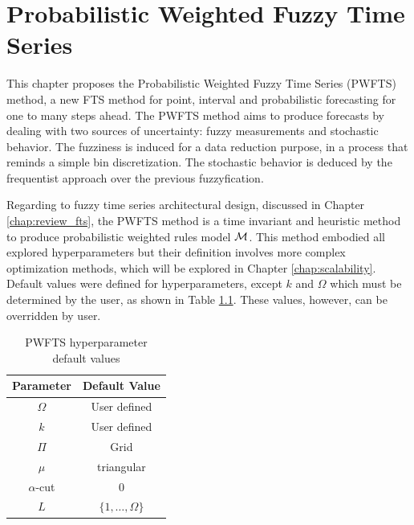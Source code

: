 \chapter[Probabilistic Weighted Fuzzy Time Series]{Probabilistic Weighted Fuzzy Time Series} 
\label{chap:pwfts}


This chapter proposes the Probabilistic Weighted Fuzzy Time Series (PWFTS) method, a new FTS method for point, interval and probabilistic forecasting for one to many steps ahead. The PWFTS method aims to produce forecasts by dealing with two sources of uncertainty: fuzzy measurements and stochastic behavior. The fuzziness is induced for a data reduction purpose, in a process that reminds a simple bin discretization. The stochastic behavior is deduced by the  frequentist approach over the previous fuzzyfication. 

Regarding to fuzzy time series architectural design, discussed in Chapter \ref{chap:review_fts}, the PWFTS method is a  time invariant and heuristic method to produce probabilistic weighted rules model $\mathcal{M}$. This method embodied all explored hyperparameters but their definition involves more complex optimization methods, which will be explored in Chapter \ref{chap:scalability}. Default values were defined for hyperparameters, except $k$ and $\Omega$ which must be determined by the user, as shown in Table \ref{tab:pwfts_hyperparam}. These values, however, can be overridden by user. 

\begin{table}[htb] 
    \centering
    \begin{tabular}{|c|c|} \hline
        \textbf{Parameter} & \textbf{Default Value}  \\ \hline
        $\Omega$ & User defined  \\ \hline
        $k$ & User defined  \\ \hline
        $\Pi$ & Grid \\ \hline
        $\mu$ & triangular  \\ \hline 
        $\alpha$-cut & 0 \\ \hline
        $L$ & $\{1,\ldots,\Omega\}$  \\ \hline
    \end{tabular}
    \caption{PWFTS hyperparameter default values}
    \label{tab:pwfts_hyperparam}
\end{table}

